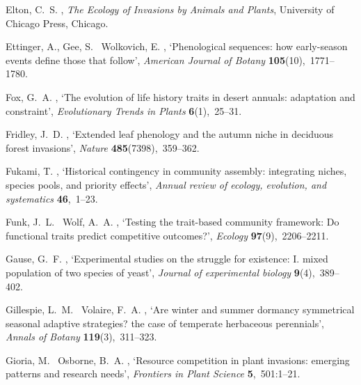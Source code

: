 \documentclass[11pt]{article}
\begin{document}
\begin{thebibliography}{xx}
Elton, C.~S.  \harvardyearright , {\em The Ecology of
  Invasions by Animals and Plants}, University of Chicago Press, Chicago.

Ettinger, A., Gee, S. \harvardand\ Wolkovich, E.  \harvardyearleft
  2018\harvardyearright , `Phenological sequences: how early-season events
  define those that follow', {\em American Journal of Botany} {\bf
  105}(10),~1771--1780.

Fox, G.~A.  \harvardyearright , `The evolution of life
  history traits in desert annuals: adaptation and constraint', {\em
  Evolutionary Trends in Plants} {\bf 6}(1),~25--31.

Fridley, J.~D.  \harvardyearright , `Extended leaf
  phenology and the autumn niche in deciduous forest invasions', {\em Nature}
  {\bf 485}(7398),~359--362.

Fukami, T.  \harvardyearright , `Historical contingency in
  community assembly: integrating niches, species pools, and priority effects',
  {\em Annual review of ecology, evolution, and systematics} {\bf 46},~1--23.

Funk, J.~L. \harvardand\ Wolf, A.~A.  \harvardyearright ,
  `Testing the trait-based community framework: Do functional traits predict
  competitive outcomes?', {\em Ecology} {\bf 97}(9),~2206--2211.

Gause, G.~F.  \harvardyearright , `Experimental studies on
  the struggle for existence: I. mixed population of two species of yeast',
  {\em Journal of experimental biology} {\bf 9}(4),~389--402.

Gillespie, L.~M. \harvardand\ Volaire, F.~A.  \harvardyearright , `Are winter and summer dormancy symmetrical seasonal
  adaptive strategies? the case of temperate herbaceous perennials', {\em
  Annals of Botany} {\bf 119}(3),~311--323.

Gioria, M. \harvardand\ Osborne, B.~A.  \harvardyearleft 2014\harvardyearright
  , `Resource competition in plant invasions: emerging patterns and research
  needs', {\em Frontiers in Plant Science} {\bf 5},~501:1--21.


\end{thebibliography}
\end{document}
